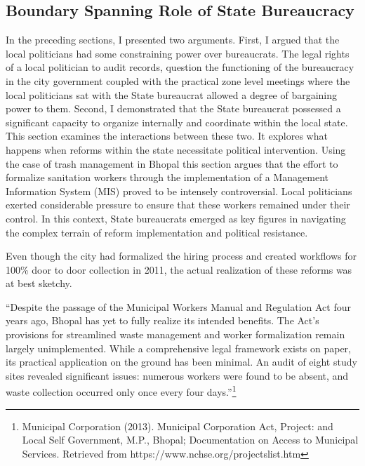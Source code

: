 \subsection{Boundary Spanning Role of State Bureaucracy}

In the preceding sections, I presented two arguments. First, I argued that the local politicians had some constraining power over bureaucrats. The legal rights of a local politician to audit records, question the functioning of the bureaucracy in the city government coupled with the practical zone level meetings where the local politicians sat with the State bureaucrat allowed a degree of bargaining power to them. Second, I demonstrated that the State bureaucrat possessed a significant capacity to organize internally and coordinate within the local state. This section examines the interactions between these two. It explores what happens when reforms within the state necessitate political intervention. Using the case of trash management in Bhopal this section argues that the effort to formalize sanitation workers through the implementation of a Management Information System (MIS) proved to be intensely controversial. Local politicians exerted considerable pressure to ensure that these workers remained under their control. In this context, State bureaucrats emerged as key figures in navigating the complex terrain of reform implementation and political resistance.

Even though the city had formalized the hiring process and created workflows for 100\% door to door collection in 2011, the actual realization of these reforms was at best sketchy.

``Despite the passage of the Municipal Workers Manual and Regulation Act four years ago, Bhopal has yet to fully realize its intended benefits. The Act's provisions for streamlined waste management and worker formalization remain largely unimplemented. While a comprehensive legal framework exists on paper, its practical application on the ground has been minimal. An audit of eight study sites revealed significant issues: numerous workers were found to be absent, and waste collection occurred only once every four days.''\footnote{Municipal Corporation (2013). Municipal Corporation Act, Project: and Local Self Government, M.P., Bhopal; Documentation on Access to Municipal Services. Retrieved from https://www.nchse.org/projectslist.htm}

